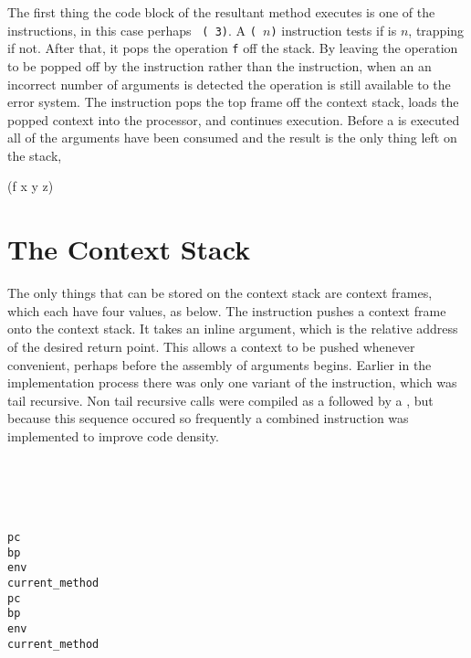 The first thing the code block of the resultant method executes is one
of the  instructions, in this case perhaps {\tt
( 3)}.  A \texttt{( $n$)} instruction
tests if  is $n$, trapping if not.  After that, it pops the
operation \texttt{f} off the stack.  By leaving the operation to be
popped off by the  instruction rather than the
 instruction, when an an incorrect number of arguments is
detected the operation is still available to the error system.  The
 instruction pops the top frame off the context stack,
loads the popped context into the processor, and continues execution.
Before a
 is executed all of the arguments have been consumed and
the result is the only thing left on the stack,
\begin{stackphoto}
 (f x y z) \\\hline
\end{stackphoto}

\section{The Context Stack}

The only things that can be stored on the context stack are context
frames, which each have four values, as below.  The 
instruction pushes a context frame onto the context stack.  It takes
an inline argument, which is the relative address of the desired
return point.  This allows a context to be pushed whenever convenient,
perhaps before the assembly of arguments begins.  Earlier in the
implementation process there was only one variant of the 
instruction, which was tail recursive.  Non tail recursive calls were
compiled as a  followed by a , but
because this sequence occured so frequently a combined instruction was
implemented to improve code density.

\begin{stackphoto}\hline
  \tt {}  \\ \hline
  \tt {}  \\ \hline
  \tt {} \\\hline
  \tt {} \\\hline\hline
  \tt pc  \\ \hline
  \tt bp  \\ \hline
  \tt env \\\hline
  \tt current\_method \\\hline\hline
  \tt pc  \\ \hline
  \tt bp  \\ \hline
  \tt env \\\hline
  \tt current\_method \\\hline
\end{stackphoto}

